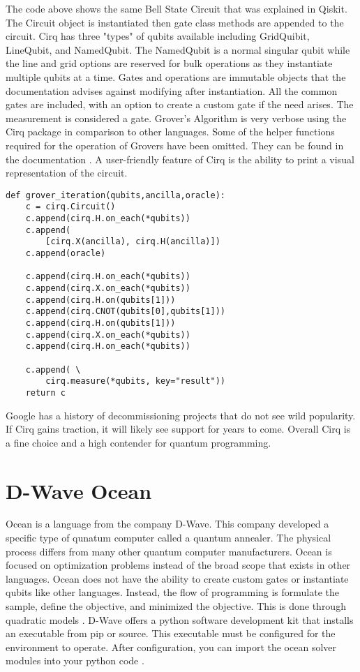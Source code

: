 \documentclass[conference]{IEEEtran}
\begin{document}
The code above shows the same Bell State Circuit that was explained in Qiskit. 
The Circuit object is instantiated then gate class methods are appended to the circuit. 
Cirq has three "types" of qubits available including GridQuibit, LineQubit, and NamedQubit. 
The NamedQubit is a normal singular qubit while the line and grid options are reserved for bulk operations as they instantiate multiple qubits at a time. 
Gates and operations are immutable objects that the documentation advises against modifying after instantiation. 
All the common gates are included, with an option to create a custom gate if the need arises. 
The measurement is considered a gate.
Grover's Algorithm is very verbose using the Cirq package in comparison to other languages. 
Some of the helper functions required for the operation of Grovers have been omitted. 
They can be found in the documentation \cite{b10}. 
A user-friendly feature of Cirq is the ability to print a visual representation of the circuit.
\begin{verbatim}
def grover_iteration(qubits,ancilla,oracle):
    c = cirq.Circuit()
    c.append(cirq.H.on_each(*qubits))
    c.append( 
        [cirq.X(ancilla), cirq.H(ancilla)])
    c.append(oracle)

    c.append(cirq.H.on_each(*qubits))
    c.append(cirq.X.on_each(*qubits))
    c.append(cirq.H.on(qubits[1]))
    c.append(cirq.CNOT(qubits[0],qubits[1]))
    c.append(cirq.H.on(qubits[1]))
    c.append(cirq.X.on_each(*qubits))
    c.append(cirq.H.on_each(*qubits))

    c.append( \
        cirq.measure(*qubits, key="result"))
    return c
\end{verbatim}
Google has a history of decommissioning projects that do not see wild popularity.
If Cirq gains traction, it will likely see support for years to come.
Overall Cirq is a fine choice and a high contender for quantum programming. 

\section{D-Wave Ocean}
Ocean is a language from the company D-Wave. 
This company developed a specific type of qunatum computer called a quantum annealer. 
The physical process differs from many other quantum computer manufacturers. 
Ocean is focused on optimization problems instead of the broad scope that exists in other languages. 
Ocean does not have the ability to create custom gates or instantiate qubits like other languages. 
Instead, the flow of programming is formulate the sample, define the objective, and minimized the objective. 
This is done through quadratic models \cite{b11}.
D-Wave offers a python software development kit that installs an executable from pip or source. 
This executable must be configured for the environment to operate. After configuration, you can import the ocean solver modules into your python code \cite{b11}.
\end{document}
